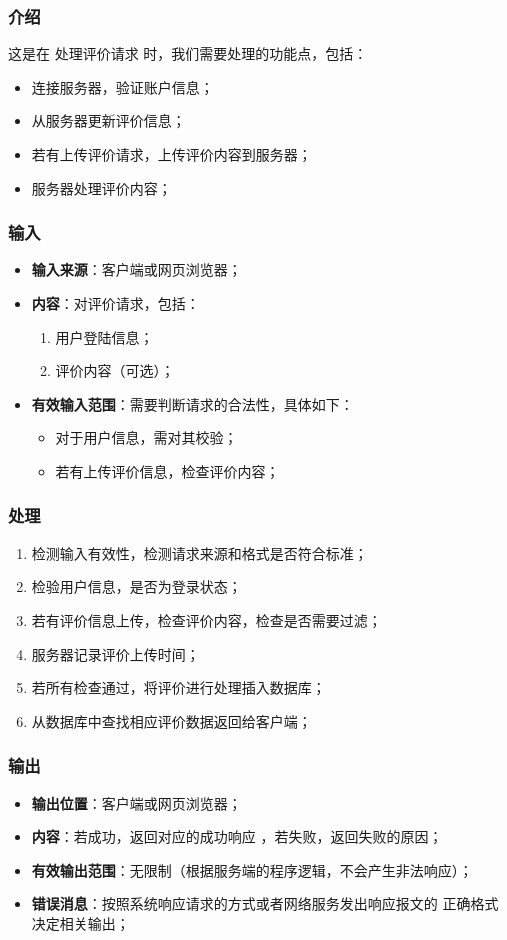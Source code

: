 \subsubsection{介绍}
	这是在 处理评价请求 时，我们需要处理的功能点，包括：
	\begin{itemize}
		\item 连接服务器，验证账户信息；
		\item 从服务器更新评价信息；
		\item 若有上传评价请求，上传评价内容到服务器；
		\item 服务器处理评价内容；
	\end{itemize}
\subsubsection{输入}
	\begin{itemize}
		\item \textbf{输入来源}：客户端或网页浏览器；
		\item \textbf{内容}：对评价请求，包括：
		\begin{enumerate}
			\item 用户登陆信息；
			\item 评价内容（可选）；
		\end{enumerate}
		\item \textbf{有效输入范围}：需要判断请求的合法性，具体如下：
		\begin{itemize}
			\item 对于用户信息，需对其校验； 
			\item 若有上传评价信息，检查评价内容； 
		\end{itemize}
	\end{itemize}
\subsubsection{处理}
	\begin{enumerate}
		\item 检测输入有效性，检测请求来源和格式是否符合标准；
		\item 检验用户信息，是否为登录状态；
		\item 若有评价信息上传，检查评价内容，检查是否需要过滤；
		\item 服务器记录评价上传时间；
		\item 若所有检查通过，将评价进行处理插入数据库；		\item 从数据库中查找相应评价数据返回给客户端；
	\end{enumerate}
\subsubsection{输出}
\begin{itemize}
	\item \textbf{输出位置}：客户端或网页浏览器；
	\item \textbf{内容}：若成功，返回对应的成功响应 ，若失败，返回失败的原因；
	\item \textbf{有效输出范围}：无限制（根据服务端的程序逻辑，不会产生非法响应）；
	\item \textbf{错误消息}：按照系统响应请求的方式或者网络服务发出响应报文的
		正确格式决定相关输出；
\end{itemize}

